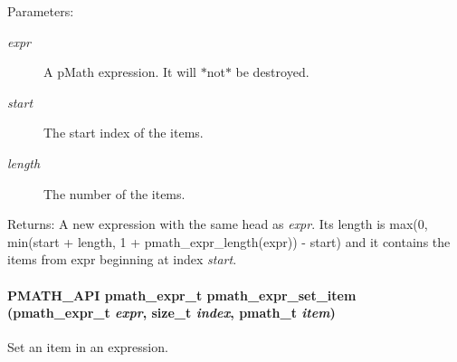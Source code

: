 \begin{Desc}
\item[Parameters:]
\begin{description}
\item[{\em expr}]A pMath expression. It will $\ast$not$\ast$ be destroyed. \item[{\em start}]The start index of the items. \item[{\em length}]The number of the items. \end{description}
\end{Desc}
\begin{Desc}
\item[Returns:]A new expression with the same head as {\em expr\/}. Its length is max(0, min(start + length, 1 + pmath\_\-expr\_\-length(expr)) - start) and it contains the items from expr beginning at index {\em start\/}. \end{Desc}
\hypertarget{group__expressions_g2771a8ad79e108e60df5dbe3ea9c7bf8}{
\paragraph[{pmath\_\-expr\_\-set\_\-item}]{\setlength{\rightskip}{0pt plus 5cm}PMATH\_\-API {\bf pmath\_\-expr\_\-t} pmath\_\-expr\_\-set\_\-item ({\bf pmath\_\-expr\_\-t} {\em expr}, \/  size\_\-t {\em index}, \/  {\bf pmath\_\-t} {\em item})}\hfill}
\label{group__expressions_g2771a8ad79e108e60df5dbe3ea9c7bf8}


Set an item in an expression. 

